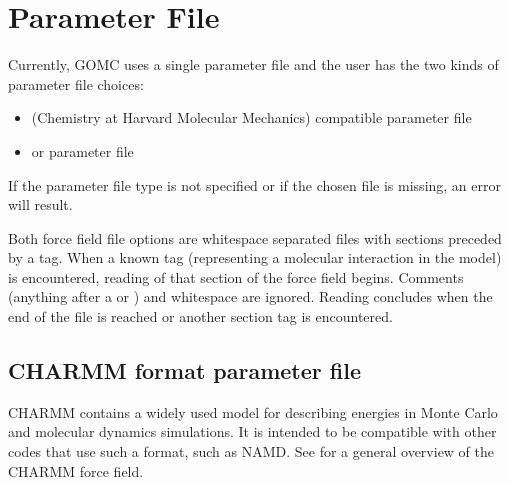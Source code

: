 \documentclass[letterpaper,10pt,english]{sphinxmanual}
\begin{document}
\section{Parameter File}
\label{\detokenize{input_file:parameter-file}}
Currently, GOMC uses a single parameter file and the user has the two kinds of parameter file choices:
\begin{itemize}
\item {} 
 (Chemistry at Harvard Molecular Mechanics) compatible parameter file

\item {} 
 or  parameter file

\end{itemize}

If the parameter file type is not specified or if the chosen file is missing, an error will result.

Both force field file options are whitespace separated files with sections preceded by a tag. When a known tag (representing a molecular interaction in the model) is encountered, reading of that section of the force field begins. Comments (anything after a \sphinxcode{\sphinxupquote{*}} or \sphinxcode{\sphinxupquote{!}}) and whitespace are ignored. Reading concludes when the end of the file is reached or another section tag is encountered.


\subsection{CHARMM format parameter file}
\label{\detokenize{input_file:charmm-format-parameter-file}}
CHARMM contains a widely used model for describing energies in Monte Carlo and molecular dynamics simulations. It is intended to be compatible with other codes that use such a format, such as NAMD. See  for a general overview of the CHARMM force field.
\end{document}
